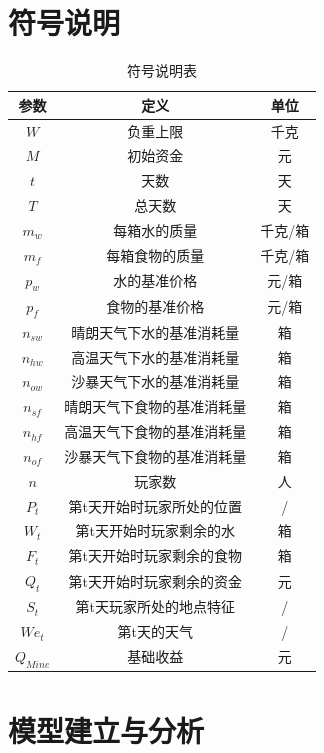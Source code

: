 \documentclass[withoutpre]{cumcmthesis} %
\begin{document}
\section{符号说明}
\begin{table}[H]
    \caption{符号说明表}\label{tab:001} \centering
    \begin{tabular}{ccc}
        \toprule[1.5pt]
        \textbf{参数} & \textbf{定义} & \textbf{单位}\\
        \midrule[1pt]
        $W$ & 负重上限 & 千克\\ 
        $M$ & 初始资金 & 元 \\
        $t$ & 天数 & 天\\
        $T$ & 总天数 & 天\\
        $m_w$ & 每箱水的质量 & 千克/箱\\
        $m_f$ & 每箱食物的质量 & 千克/箱 \\
        $p_w$ & 水的基准价格 & 元/箱\\
        $p_f$ & 食物的基准价格 & 元/箱\\
        $n_{sw}$ & 晴朗天气下水的基准消耗量 & 箱\\
        $n_{hw}$ & 高温天气下水的基准消耗量 & 箱\\
        $n_{ow}$ & 沙暴天气下水的基准消耗量 & 箱\\
        $n_{sf}$ & 晴朗天气下食物的基准消耗量 & 箱\\
        $n_{hf}$ & 高温天气下食物的基准消耗量 & 箱\\
        $n_{of}$ & 沙暴天气下食物的基准消耗量 & 箱\\
        $n$ & 玩家数 & 人 \\
        $P_{t}$ & 第t天开始时玩家所处的位置 & / \\
        $W_{t}$ & 第t天开始时玩家剩余的水 & 箱 \\
        $F_{t}$ & 第t天开始时玩家剩余的食物 & 箱 \\ 
        $Q_{t}$ & 第t天开始时玩家剩余的资金 & 元 \\
        $S_{t}$ & 第t天玩家所处的地点特征 & /\\
        $We_t$ & 第t天的天气 & /\\
        $Q_{Mine}$ & 基础收益 & 元\\
        
        \bottomrule[1.5pt]
    \end{tabular}
\end{table}


\section{模型建立与分析}
\end{document}
